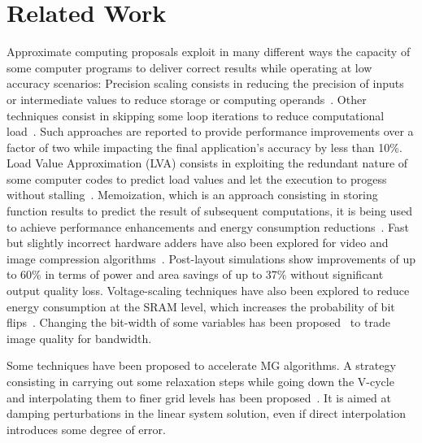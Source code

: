 \section{Related Work}
\label{sec:related}

Approximate computing proposals exploit in many different ways the capacity of
some computer programs to deliver correct results while operating at low
accuracy scenarios: Precision scaling consists in reducing the precision of
inputs or intermediate values to reduce storage or computing
operands~\cite{Yeh2007, Tian2015}.  Other techniques consist in skipping some
loop iterations to reduce computational load~\cite{Sidiroglou2011}.  
Such approaches are reported to provide performance improvements over a factor of two
while impacting the final application's accuracy by less than 10\%.
Load Value
Approximation (LVA) consists in exploiting the redundant nature of some
computer codes to predict load values and let the execution to progess without
stalling~\cite{Miguel2014}.  Memoization, which is an approach consisting in
storing function results to predict the result of subsequent computations, it
is being used to achieve performance enhancements and energy consumption
reductions~\cite{Alvarez2005, Brumar2017}. 
Fast but slightly incorrect
hardware adders have also been explored 
for video and image compression algorithms~\cite{Gupta:2011}. 
Post-layout simulations show improvements of up to 60\% in terms of power and area savings of up to 37\%
without significant output quality loss.
Voltage-scaling techniques have also been explored to reduce energy consumption at the SRAM level, which increases
the probability of bit flips~\cite{Sampson:2011}. 
Changing the bit-width of
some variables has been proposed~\cite{Park:2010} to trade image quality for
bandwidth.

Some techniques have been proposed to accelerate MG algorithms.  A strategy
consisting in   carrying out some relaxation steps while going down the V-cycle
and interpolating them to finer grid levels has been proposed~\cite{JAMESON}.
It is aimed at damping perturbations in the linear system solution, even if
direct interpolation introduces some degree of error.


